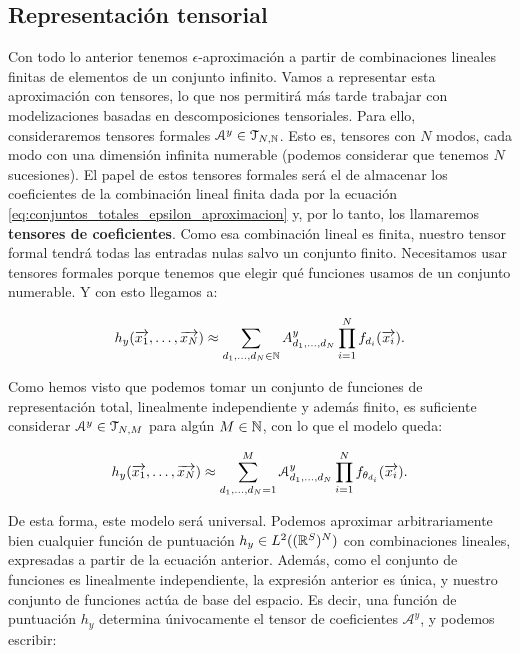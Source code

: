\subsection{Representación tensorial}

Con todo lo anterior tenemos $\epsilon$-aproximación a partir de combinaciones lineales finitas de elementos de un conjunto infinito. Vamos a representar esta aproximación con tensores, lo que nos permitirá más tarde trabajar con modelizaciones basadas en descomposiciones tensoriales. Para ello, consideraremos tensores formales $\mathcal{A}^y \in \mathcal{T}_{N, \mathbb{N}}$. Esto es, tensores con $N$ modos, cada modo con una dimensión infinita numerable (podemos considerar que tenemos $N$ sucesiones). El papel de estos tensores formales será el de almacenar los coeficientes de la combinación lineal finita dada por la ecuación \eqref{eq:conjuntos_totales_epsilon_aproximacion} y, por lo tanto, los llamaremos \textbf{tensores de coeficientes}. Como esa combinación lineal es finita, nuestro tensor formal tendrá todas las entradas nulas salvo un conjunto finito. Necesitamos usar tensores formales porque tenemos que elegir qué funciones usamos de un conjunto numerable. Y con esto llegamos a:

\begin{equation} \label{eq:hipotesis_en_general}
	h_y(\overrightarrow{x_1}, \ldots, \overrightarrow{x_N}) \approx \sum_{d_1, \ldots, d_N \in \mathbb{N}} A^y_{d_1, \ldots, d_N} \prod_{i = 1}^N f_{d_i}(\overrightarrow{x_i}).
\end{equation}

Como hemos visto que podemos tomar un conjunto de funciones de representación total, linealmente independiente y además finito, es suficiente considerar $\mathcal{A}^y \in \mathcal{T}_{N, M}$ para algún $M \in \mathbb{N}$, con lo que el modelo queda:

\begin{equation}
	h_y(\overrightarrow{x_1}, \ldots, \overrightarrow{x_N}) \approx \sum_{d_1, \ldots, d_N = 1}^{M} \mathcal{A}^y_{d_1, \ldots, d_N} \prod_{i = 1}^N f_{\theta_{d_i}}(\overrightarrow{x_i}).
\end{equation}

De esta forma, este modelo será universal. Podemos aproximar arbitrariamente bien cualquier función de puntuación $h_y \in L^2((\mathbb{R}^S)^N)$ con combinaciones lineales, expresadas a partir de la ecuación anterior. Además, como el conjunto de funciones es linealmente independiente, la expresión anterior es única, y nuestro conjunto de funciones actúa de base del espacio. Es decir, una función de puntuación $h_y$ determina únivocamente el tensor de coeficientes $\mathcal{A}^y$, y podemos escribir:

